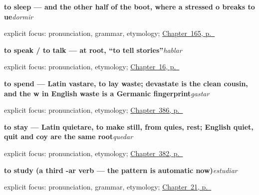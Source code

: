 \noindent\begin{minipage}[t]{\linewidth}
\raggedright
\textbf{to sleep — and the other half of the boot, where a stressed o breaks to ue}\enspace\emph{dormir}\par
\footnotesize explicit focus: pronunciation, grammar, etymology; \hyperref[ch:spanish-hear-sleep-walk-run]{Chapter~165, p.~\pageref*{ch:spanish-hear-sleep-walk-run}}
\end{minipage}\par\smallskip

\noindent\begin{minipage}[t]{\linewidth}
\raggedright
\textbf{to speak / to talk — at root, \textquotedblleft{}to tell stories\textquotedblright{}}\enspace\emph{hablar}\par
\footnotesize explicit focus: pronunciation, etymology; \hyperref[ch:first-verb]{Chapter~16, p.~\pageref*{ch:first-verb}}
\end{minipage}\par\smallskip

\noindent\begin{minipage}[t]{\linewidth}
\raggedright
\textbf{to spend — Latin vastare, to lay waste; devastate is the clean cousin, and the w in English waste is a Germanic fingerprint}\enspace\emph{gastar}\par
\footnotesize explicit focus: pronunciation, etymology; \hyperref[ch:vender-y-servir]{Chapter~386, p.~\pageref*{ch:vender-y-servir}}
\end{minipage}\par\smallskip

\noindent\begin{minipage}[t]{\linewidth}
\raggedright
\textbf{to stay — Latin quietare, to make still, from quies, rest; English quiet, quit and coy are the same root}\enspace\emph{quedar}\par
\footnotesize explicit focus: pronunciation, etymology; \hyperref[ch:acabar-y-empezar]{Chapter~382, p.~\pageref*{ch:acabar-y-empezar}}
\end{minipage}\par\smallskip

\noindent\begin{minipage}[t]{\linewidth}
\raggedright
\textbf{to study (a third -ar verb — the pattern is automatic now)}\enspace\emph{estudiar}\par
\footnotesize explicit focus: pronunciation, grammar, etymology; \hyperref[ch:spanish-estudiar]{Chapter~21, p.~\pageref*{ch:spanish-estudiar}}
\end{minipage}\par\smallskip

